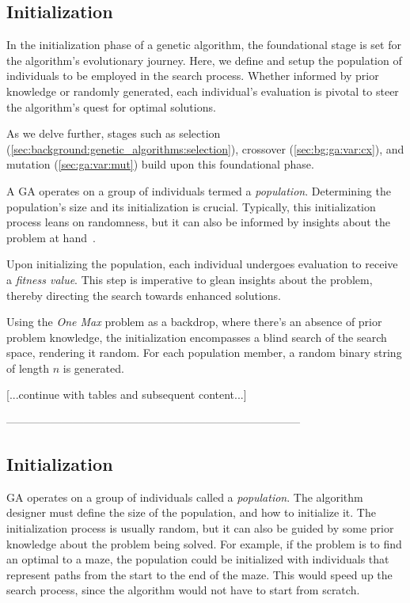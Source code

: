 \subsection{Initialization}
\label{sec:genetic_algorithms:initialization}

  In the initialization phase of a genetic algorithm, the foundational stage is 
  set for the algorithm's evolutionary journey.
  Here, we define and setup the population of individuals to be employed in the 
  search process.
  Whether informed by prior knowledge or randomly generated, each individual's evaluation is pivotal to steer the algorithm's quest for optimal solutions.

  As we delve further, stages such as selection 
  (\vref{sec:background:genetic_algorithms:selection}), crossover 
  (\vref{sec:bg:ga:var:cx}), and mutation (\vref{sec:ga:var:mut}) build upon 
  this foundational phase.

  A GA operates on a group of individuals termed a \emph{population}.
  Determining the population's size and its initialization is crucial.
  Typically, this initialization process leans on randomness, but it can also 
  be informed by insights about the problem at hand~\autocite{dasguptaComparisonMultiobjectiveEvolutionary2008}.
  
  Upon initializing the population, each individual undergoes evaluation to receive a \emph{fitness value}.
  This step is imperative to glean insights about the problem, thereby directing the search towards enhanced solutions.

  Using the \emph{One Max} problem as a backdrop, where there's an absence of prior problem knowledge, the initialization encompasses a blind search of the search space, rendering it random.
  For each population member, a random binary string of length \(n\) is generated.

  [...continue with tables and subsequent content...]


--------------------------------------------------------------------------------

\subsection{Initialization}
\label{sec:genetic_algorithms:initialization}
  GA operates on a group of individuals called a \emph{population}.
  The algorithm designer must define the size of the population, and how to 
  initialize it.
  The initialization process is usually random, but it can also be guided by 
  some prior knowledge about the problem being solved.
  For example, if the problem is to find an optimal  to a maze, the population 
  could be initialized with individuals that represent paths from the start to 
  the end of the maze.
  This would speed up the search process, since the algorithm would not have to 
  start from scratch.

